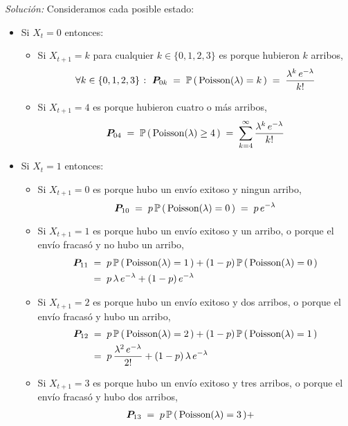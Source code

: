 \documentclass[ a4paper, twoside, 11pt]{article}
\begin{document}
\begin{problem}
\emph{Soluci\'on:} Consideramos cada posible estado: 
\begin{itemize}
\item Si $X_t = 0$ entonces: 
\begin{itemize}
\item Si $X_{t+1} = k$ para cualquier $k \in \{ 0, 1, 2, 3 \}$ es porque hubieron $k$ arribos, \iec
\[
\forall k \in \{ 0, 1, 2, 3 \} \; \colon \;
{\boldsymbol{P}}_{0k} \; = \;
\mathbb{P} \, ( \, \text{Poisson}(\lambda) = k \, ) \; = \; 
\frac{ \lambda^k \, e^{-\lambda} }{k!}
\]
\item Si $X_{t+1} = 4$ es porque hubieron cuatro o m\'as arribos, \iec
\[
{\boldsymbol{P}}_{04} \; = \;
\mathbb{P} \, ( \, \text{Poisson}(\lambda) \geq 4 \, ) \; = \; 
\sum_{k=4}^{\infty} \frac{ \lambda^k \, e^{-\lambda} }{k!}
\]
\end{itemize}
\item Si $X_t = 1$ entonces: 
\begin{itemize}
\item Si $X_{t+1} = 0$ es porque hubo un env\'io exitoso y ningun arribo, \iec 
\[
{\boldsymbol{P}}_{10} \; = \;
p \, \mathbb{P} \, ( \, \text{Poisson}(\lambda) = 0 \, ) \; = \; 
p \, e^{-\lambda}
\]
\item Si $X_{t+1} = 1$ es porque hubo un env\'io exitoso y un arribo, o porque el env\'io fracas\'o y no hubo un arribo, \iec 
\begin{align*}
{\boldsymbol{P}}_{11} \; 
& = \; p \, \mathbb{P} \, ( \, \text{Poisson}(\lambda) = 1 \, ) + 
(1-p) \, \mathbb{P} \, ( \, \text{Poisson}(\lambda) = 0 \, ) \\
& = \; p \, \lambda \, e^{-\lambda} + (1-p) \, e^{-\lambda}
\end{align*}
\item Si $X_{t+1} = 2$ es porque hubo un env\'io exitoso y dos arribos, o porque el env\'io fracas\'o y hubo un arribo, \iec 
\begin{align*}
{\boldsymbol{P}}_{12} \; 
& = \; p \, \mathbb{P} \, ( \, \text{Poisson}(\lambda) = 2 \, ) + 
(1-p) \, \mathbb{P} \, ( \, \text{Poisson}(\lambda) = 1 \, ) \\
& = \; p \, \frac{\lambda^2 \, e^{-\lambda}}{2!} 
+ (1-p) \, \lambda \, e^{-\lambda}
\end{align*}
\item Si $X_{t+1} = 3$ es porque hubo un env\'io exitoso y tres arribos, o porque el env\'io fracas\'o y hubo dos arribos, \iec 
\begin{align*}
\vec{P}_{13} \; 
& = \; p \, \Pr \, ( \, \Poisson(\lambda) = 3 \, ) + 

\end{align*}
\end{itemize}
\end{itemize}
\end{problem}
\end{document}
